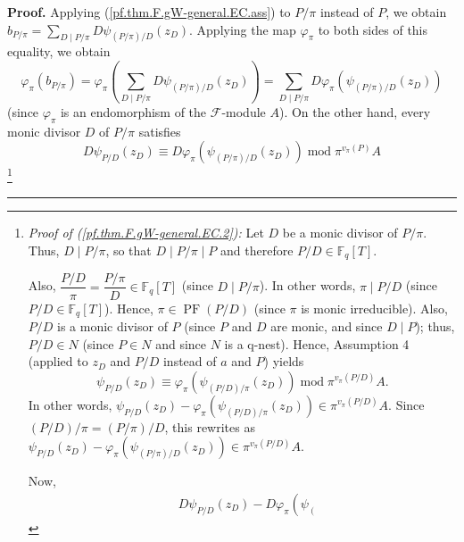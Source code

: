 \documentclass[numbers=enddot,12pt,final,onecolumn,notitlepage]{scrartcl}%
\theoremstyle{definition}
\newenvironment{proof}[1][Proof]{\noindent\textbf{#1.} }{\ \rule{0.5em}{0.5em}}
\let\sumnonlimits\sum
\renewcommand{\sum}{\sumnonlimits\limits}
\begin{document}
\begin{proof}
Applying (\ref{pf.thm.F.gW-general.EC.ass}) to $P/\pi$ instead of $P$, we
obtain $b_{P/\pi}=\sum_{D\mid P/\pi}D\psi_{\left(  P/\pi\right)  /D}\left(
z_{D}\right)  $. Applying the map $\varphi_{\pi}$ to both sides of this
equality, we obtain%
\begin{equation}
\varphi_{\pi}\left(  b_{P/\pi}\right)  =\varphi_{\pi}\left(  \sum_{D\mid
P/\pi}D\psi_{\left(  P/\pi\right)  /D}\left(  z_{D}\right)  \right)
=\sum_{D\mid P/\pi}D\varphi_{\pi}\left(  \psi_{\left(  P/\pi\right)
/D}\left(  z_{D}\right)  \right)  \label{pf.thm.F.gW-general.EC.0}%
\end{equation}
(since $\varphi_{\pi}$ is an endomorphism of the $\mathcal{F}$-module $A$). On
the other hand, every monic divisor $D$ of $P/\pi$ satisfies%
\begin{equation}
D\psi_{P/D}\left(  z_{D}\right)  \equiv D\varphi_{\pi}\left(  \psi_{\left(
P/\pi\right)  /D}\left(  z_{D}\right)  \right)  \operatorname{mod}\pi^{v_{\pi
}\left(  P\right)  }A \label{pf.thm.F.gW-general.EC.2}%
\end{equation}
\footnote{\textit{Proof of (\ref{pf.thm.F.gW-general.EC.2}):} Let $D$ be a
monic divisor of $P/\pi$. Thus, $D\mid P/\pi$, so that $D\mid P/\pi\mid P$ and
therefore $P/D\in\mathbb{F}_{q}\left[  T\right]  $.
\par
Also, $\dfrac{P/D}{\pi}=\dfrac{P/\pi}{D}\in\mathbb{F}_{q}\left[  T\right]  $
(since $D\mid P/\pi$). In other words, $\pi\mid P/D$ (since $P/D\in
\mathbb{F}_{q}\left[  T\right]  $). Hence, $\pi\in\operatorname*{PF}\left(
P/D\right)  $ (since $\pi$ is monic irreducible). Also, $P/D$ is a monic
divisor of $P$ (since $P$ and $D$ are monic, and since $D\mid P$); thus,
$P/D\in N$ (since $P\in N$ and since $N$ is a q-nest). Hence, Assumption 4
(applied to $z_{D}$ and $P/D$ instead of $a$ and $P$) yields%
\[
\psi_{P/D}\left(  z_{D}\right)  \equiv\varphi_{\pi}\left(  \psi_{\left(
P/D\right)  /\pi}\left(  z_{D}\right)  \right)  \operatorname{mod}\pi^{v_{\pi
}\left(  P/D\right)  }A.
\]
In other words, $\psi_{P/D}\left(  z_{D}\right)  -\varphi_{\pi}\left(
\psi_{\left(  P/D\right)  /\pi}\left(  z_{D}\right)  \right)  \in\pi^{v_{\pi
}\left(  P/D\right)  }A$. Since $\left(  P/D\right)  /\pi=\left(
P/\pi\right)  /D$, this rewrites as $\psi_{P/D}\left(  z_{D}\right)
-\varphi_{\pi}\left(  \psi_{\left(  P/\pi\right)  /D}\left(  z_{D}\right)
\right)  \in\pi^{v_{\pi}\left(  P/D\right)  }A$.
\par
Now,%
\begin{align*}
&  D\psi_{P/D}\left(  z_{D}\right)  -D\varphi_{\pi}\left(  \psi_{\left(
}
\end{align*}}
\end{proof}
\end{document}
